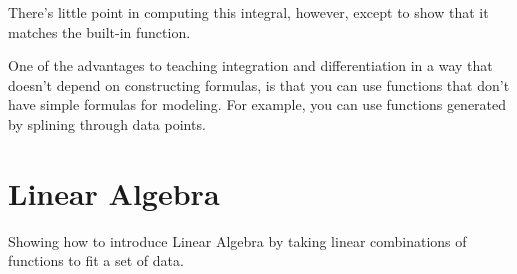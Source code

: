 There's little point in computing this integral, however, except to
show that it matches the built-in  function.

One of the advantages to teaching integration and differentiation in a
way that doesn't depend on constructing formulas, is that you can use
functions that don't have simple formulas for modeling.  For example,
you can use functions generated by splining through data points.


  

\section{Linear Algebra}

Showing how to introduce Linear Algebra by taking linear combinations
of functions to fit a set of data.


